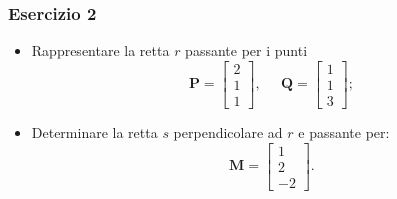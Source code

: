 \documentclass{beamer}
\begin{document}
    
%
%
\begin{frame}
\frametitle{Esercizio 2}
\begin{itemize}
\item Rappresentare la retta $r$ passante per i punti
\begin{displaymath}
\mathbf{P}=\begin{bmatrix}2\\1\\1 \end{bmatrix},\;\;\;\;\;
\mathbf{Q}=\begin{bmatrix}1\\1\\3 \end{bmatrix};
\end{displaymath}
\item Determinare la retta $s$ perpendicolare ad $r$ e passante per:
\begin{displaymath}
\mathbf{M}=\begin{bmatrix}1\\2\\-2 \end{bmatrix}.
\end{displaymath}
\end{itemize}
\end{frame}
\end{document}
